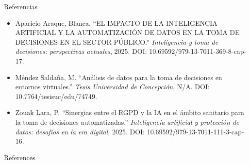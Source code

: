 \documentclass[aspectratio=169]{beamer}
\begin{document}
\begin{frame}[fragile]{Referencias}


\begin{itemize}
  \item Aparicio Araque, Blanca. ``EL IMPACTO DE LA INTELIGENCIA ARTIFICIAL Y LA AUTOMATIZACIÓN DE DATOS EN LA TOMA DE DECISIONES EN EL SECTOR PÚBLICO.'' \textit{Inteligencia y toma de decisiones: perspectivas actuales}, 2025. DOI: 10.69592/979-13-7011-369-8-cap-17.
  \item Méndez Saldaña, M. ``Análisis de datos para la toma de decisiones en entornos virtuales.'' \textit{Tesis Universidad de Concepción}, N/A. DOI: 10.7764/tesisuc/edu/74749.
  \item Zouak Lara, P. ``Sinergias entre el RGPD y la IA en el ámbito sanitario para la toma de decisiones automatizadas.'' \textit{Inteligencia artificial y protección de datos: desafíos en la era digital}, 2025. DOI: 10.69592/979-13-7011-111-3-cap-16.
\end{itemize}
\end{frame}




\begin{frame}[allowframebreaks]{References}
  
  
\end{frame}
\end{document}
